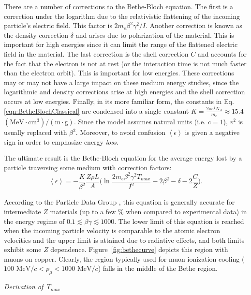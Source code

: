 There are a number of corrections to the Bethe-Bloch equation. The first is a correction under the logarithm due to the relativistic flattening of the incoming particle's electric field. This factor is  $2m_e \beta^2 \gamma^2 / I$. Another correction is known as the density correction $\delta$ and arises due to polarization of the material. This is important for high energies since it can limit the range of the flattened electric field in the material. The last correction is the shell correction $C$ and accounts for the fact that the electron is not at rest (or the interaction time is not much faster than the electron orbit). This is important for low energies. These corrections may or may not have a large impact on these medium energy studies, since the logarithmic and density corrections arise at high energies and the shell correction occurs at low energies. Finally, in its more familiar form, the constants in Eq. \eqref{eqn:BetheBlochClassical} are condensed into a single constant $K=\frac{2\pi e^4 N_A}{m_e}\approx 15.4$ $ (\text{MeV}\cdot \text{cm}^3)/(\text{m}\cdot \text{g})$. Since the model assumes natural units (i.e. $c=1$), $v^2$ is usually replaced with $\beta ^2$. Moreover, to avoid confusion $\left<\epsilon\right>$ is given a negative sign in order to emphasize energy \emph{loss}.

The ultimate result is the Bethe-Bloch equation for the average energy lost by a particle traversing some medium with correction factors:
\begin{equation}\label{eqn:bethebloch}
\left< \epsilon \right> = -\frac{K}{\beta^2}\frac{Z\rho L}{A}\Big(\ln{\frac{2m_e \beta ^2 \gamma ^2 T_{max}}{I^2}}-2\beta^2-\delta-2\frac{C}{Z}\Big).
\end{equation}

According to the Particle Data Group \cite{PDG}, this equation is generally accurate for intermediate $Z$ materials (up to a few \% when compared to experimental data) in the energy regime of $0.1 \lesssim \beta \gamma \lesssim 1000$. The lower limit of this equation is reached when the incoming particle velocity is comparable to the atomic electron velocities and the upper limit is attained due to radiative effects, and both limits exhibit some $Z$ dependence. Figure~\ref{fig:bethecurve} depicts this region with muons on copper. Clearly, the region typically used for muon ionization cooling ($100 \text{ MeV/}c < p_\mu < 1000 \text{ MeV/}c$) falls in the middle of the Bethe region.

\vspace{24pt}
\noindent \textit{\large{Derivation of $\,T_{max}$}}
\vspace{12pt}

